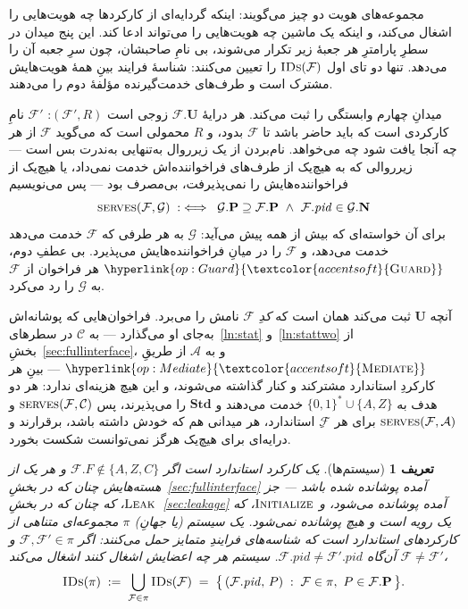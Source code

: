 \documentclass[10pt,oneside,openany]{book}
\newcommand{\Ps}{\mathbf{P}}
\newcommand{\PID}{\mathit{pid}}
\newcommand{\admits}{\mathbf{N}}
\newcommand{\Stdpid}{\mathbf{Std}}
\newcommand{\uses}{\mathbf{U}}
\newcommand{\serves}{\op{serves}}
\newcommand{\Corr}{\mathcal{C}}
\newcommand{\F}{\mathcal{F}}
\newcommand{\G}{\mathcal{G}}
\newcommand{\Adv}{\mathcal{A}}
\newcommand{\op}[1]{\textnormal{\textsc{#1}}}
\newcommand{\opl}[1]{\hyperlink{op:#1}{\textcolor{accentsoft}{\op{#1}}}}
\newcommand{\IDs}{\op{IDs}}
\newcommand{\bits}{\{0,1\}^*}
\theoremstyle{accentdef}
\newtheorem{definition}{تعریف}[chapter]
\theoremstyle{accentplain}
\begin{document}
مجموعه‌های هویت دو چیز می‌گویند: اینکه گردایه‌ای از کارکردها چه هویت‌هایی
را اشغال می‌کند، و اینکه یک ماشین چه هویت‌هایی را می‌تواند ادعا کند. این
پنج میدان در سطرِ پارامترِ هر جعبهٔ زیر تکرار می‌شوند، بی نامِ صاحبشان،
چون سرِ جعبه آن را می‌دهد. تنها دو تای اول $\IDs(\F)$ را تعیین می‌کنند:
شناسهٔ فرایند بینِ همهٔ هویت‌هایش مشترک است و طرف‌های خدمت‌گیرنده مؤلفهٔ
دوم را می‌دهند.

میدانِ چهارم وابستگی را ثبت می‌کند. هر درایهٔ $\F.\uses$ زوجی است
$(\F',R)$: $\F'$ نامِ کارکردی است که باید حاضر باشد تا $\F$ بدود، و $R$
محمولی است که می‌گوید $\F$ از هر چه آنجا یافت شود چه می‌خواهد. نام‌بردن از
یک زیرروال به‌تنهایی به‌ندرت بس است --- زیرروالی که به هیچ‌یک از طرف‌های
فراخواننده‌اش خدمت نمی‌داد، یا هیچ‌یک از فراخواننده‌هایش را نمی‌پذیرفت،
بی‌مصرف بود --- پس می‌نویسیم
\[
  \serves(\F,\G) \;:\iff\; \G.\Ps \supseteq \F.\Ps \ \wedge\ \F.\PID \in \G.\admits
\]
برای آن خواسته‌ای که بیش از همه پیش می‌آید: $\G$ به هر طرفی که $\F$ خدمت
می‌دهد خدمت می‌دهد، و $\F$ را در میانِ فراخواننده‌هایش می‌پذیرد. بی عطفِ
دوم، $\opl{Guard}$ هر فراخوان از $\F$ به $\G$ را رد می‌کرد.

آنچه $\uses$ ثبت می‌کند همان است که \emph{کدِ} $\F$ نامش را می‌برد.
فراخوان‌هایی که پوشانه‌اش به‌جای او می‌گذارد --- به $\Corr$ در
سطرهای~\ref{ln:stat} و~\ref{ln:stattwo} از بخشِ~\ref{sec:fullinterface}، و
به $\Adv$ از طریقِ $\opl{Mediate}$ --- بینِ هر کارکردِ استاندارد مشترکند و
کنار گذاشته می‌شوند، و این هیچ هزینه‌ای ندارد: هر دو هدف به $\bits \cup
\{A,Z\}$ خدمت می‌دهند و $\Stdpid$ را می‌پذیرند، پس $\serves(\F,\Corr)$ و
$\serves(\F,\Adv)$ برای هر $\F$ِ استاندارد، هر میدانی هم که خودش داشته
باشد، برقرارند و درایه‌ای برای هیچ‌یک هرگز نمی‌توانست شکست بخورد.

\begin{definition}[سیستم‌ها]\label{def:sys}
یک کارکرد \emph{استاندارد} است اگر $\F.F \notin \{A,Z,C\}$ و هر یک از
هسته‌هایش چنان که در بخشِ~\ref{sec:fullinterface} آمده پوشانده شده باشد ---
جز $\op{Leak}$، که چنان که در بخشِ~\ref{sec:leakage} آمده پوشانده می‌شود، و
$\op{Initialize}$، که یک رویه است و هیچ پوشانده نمی‌شود. یک \emph{سیستم}
(یا \emph{جهانِ}) $\pi$ مجموعه‌ای متناهی از کارکردهای استاندارد است که
شناسه‌های فرایندِ متمایز حمل می‌کنند: اگر $\F,\F' \in \pi$ و $\F \neq \F'$
آن‌گاه $\F.\PID \neq \F'.\PID$. سیستم هر چه اعضایش اشغال کنند اشغال
می‌کند،
\[
  \IDs(\pi) \;:=\; \bigcup_{\F \in \pi} \IDs(\F) \;=\; \bigl\{\, (\F.\PID,\, P) \;:\; \F \in \pi,\ P \in \F.\Ps \,\bigr\} .
\]
\end{definition}
\end{document}
